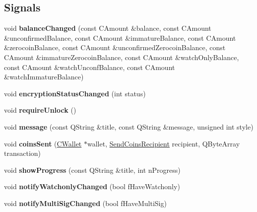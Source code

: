 \subsection*{Signals}
\begin{DoxyCompactItemize}
\item 
\mbox{\label{class_wallet_model_a06ef447cd32a737f77df483812b48f5c}} 
void {\bfseries balance\+Changed} (const C\+Amount \&balance, const C\+Amount \&unconfirmed\+Balance, const C\+Amount \&immature\+Balance, const C\+Amount \&zerocoin\+Balance, const C\+Amount \&unconfirmed\+Zerocoin\+Balance, const C\+Amount \&immature\+Zerocoin\+Balance, const C\+Amount \&watch\+Only\+Balance, const C\+Amount \&watch\+Unconf\+Balance, const C\+Amount \&watch\+Immature\+Balance)
\item 
\mbox{\label{class_wallet_model_a4fc1b30b795f66ebed3e48db3a489876}} 
void {\bfseries encryption\+Status\+Changed} (int status)
\item 
\mbox{\label{class_wallet_model_acc639a99e4aa34f32110f6b2bdef2393}} 
void {\bfseries require\+Unlock} ()
\item 
\mbox{\label{class_wallet_model_a6fc133a1c8712722db6607d067b58c6d}} 
void {\bfseries message} (const Q\+String \&title, const Q\+String \&message, unsigned int style)
\item 
\mbox{\label{class_wallet_model_ad625ad874bc4155e9300c222040eef66}} 
void {\bfseries coins\+Sent} (\mbox{\hyperlink{class_c_wallet}{C\+Wallet}} $\ast$wallet, \mbox{\hyperlink{class_send_coins_recipient}{Send\+Coins\+Recipient}} recipient, Q\+Byte\+Array transaction)
\item 
\mbox{\label{class_wallet_model_a6c445e6ea25889e14542762e54ced44f}} 
void {\bfseries show\+Progress} (const Q\+String \&title, int n\+Progress)
\item 
\mbox{\label{class_wallet_model_a6568a470db58549d57c0ccf5d6b0d997}} 
void {\bfseries notify\+Watchonly\+Changed} (bool f\+Have\+Watchonly)
\item 
\mbox{\label{class_wallet_model_a73065e2e6871f0207a107ffec6382ce5}} 
void {\bfseries notify\+Multi\+Sig\+Changed} (bool f\+Have\+Multi\+Sig)
\end{DoxyCompactItemize}
